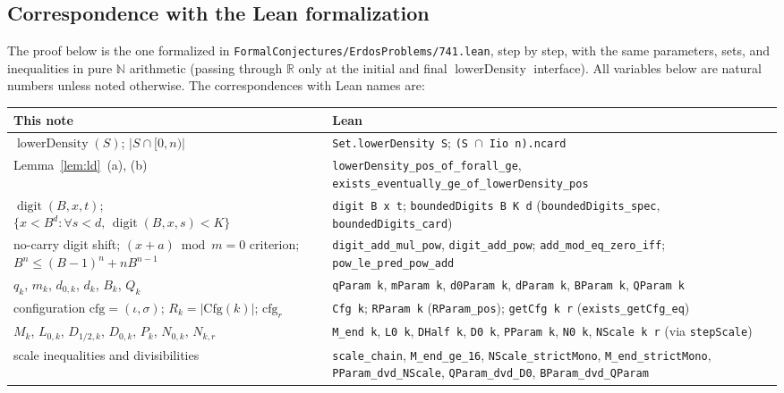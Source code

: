 \documentclass[11pt,a4paper]{amsart}
\newcommand{\digit}{\operatorname{digit}}
\newcommand{\lowerDensity}{\operatorname{lowerDensity}}
\begin{document}
\subsection*{Correspondence with the Lean formalization}
The proof below is the one formalized in \nolinkurl{FormalConjectures/ErdosProblems/741.lean}, step by step, with the same parameters, sets, and inequalities in pure $\mathbb{N}$ arithmetic (passing through $\mathbb{R}$ only at the initial and final $\lowerDensity$ interface). All variables below are natural numbers unless noted otherwise. The correspondences with Lean names are:
\begingroup
\small
\begin{longtable}{@{}>{\raggedright\arraybackslash}p{}>{\raggedright\arraybackslash}p{}@{}}
\hline
This note & Lean \\
\hline
\endhead
$\lowerDensity(S)$; $|S \cap [0, n)|$ & \texttt{Set.lowerDensity S}; \texttt{(S $\cap$ Iio n).ncard} \\
Lemma~\ref{lem:ld}~(a), (b) & \texttt{lowerDensity\_pos\_of\_forall\_ge}, \texttt{exists\_eventually\_ge\_of\_lowerDensity\_pos} \\
$\digit(B, x, t)$; $\{x < B^d : \forall s < d,\, \digit(B, x, s) < K\}$ & \texttt{digit B x t}; \texttt{boundedDigits B K d} (\texttt{boundedDigits\_spec}, \texttt{boundedDigits\_card}) \\
no-carry digit shift; $(x + a) \bmod m = 0$ criterion; $B^n \le (B - 1)^n + n B^{n - 1}$ & \texttt{digit\_add\_mul\_pow}, \texttt{digit\_add\_pow}; \texttt{add\_mod\_eq\_zero\_iff}; \texttt{pow\_le\_pred\_pow\_add} \\
$q_k$, $m_k$, $d_{0,k}$, $d_k$, $B_k$, $Q_k$ & \texttt{qParam k}, \texttt{mParam k}, \texttt{d0Param k}, \texttt{dParam k}, \texttt{BParam k}, \texttt{QParam k} \\
configuration $\mathrm{cfg} = (\iota, \sigma)$; $R_k = |\mathrm{Cfg}(k)|$; $\mathrm{cfg}_r$ & \texttt{Cfg k}; \texttt{RParam k} (\texttt{RParam\_pos}); \texttt{getCfg k r} (\texttt{exists\_getCfg\_eq}) \\
$M_k$, $L_{0,k}$, $D_{1/2,k}$, $D_{0,k}$, $P_k$, $N_{0,k}$, $N_{k,r}$ & \texttt{M\_end k}, \texttt{L0 k}, \texttt{DHalf k}, \texttt{D0 k}, \texttt{PParam k}, \texttt{N0 k}, \texttt{NScale k r} (via \texttt{stepScale}) \\
scale inequalities and divisibilities & \texttt{scale\_chain}, \texttt{M\_end\_ge\_16}, \texttt{NScale\_strictMono}, \texttt{M\_end\_strictMono}, \texttt{PParam\_dvd\_NScale}, \texttt{QParam\_dvd\_D0}, \texttt{BParam\_dvd\_QParam} \\

\end{longtable}
\end{document}
